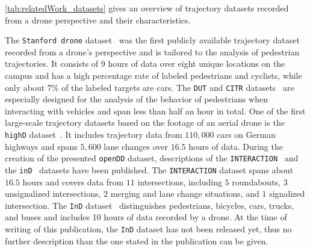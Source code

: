 \documentclass[a4paper, 10pt, conference]{ieeeconf}      %
\begin{document}
\autoref{tab:relatedWork_datasets} gives an overview of trajectory datasets recorded from a drone perspective and their characteristics.

The \texttt{Stanford drone} dataset~\cite{robicquet_learning_2016} was the first publicly available trajectory dataset recorded from a drone's perspective and is tailored to the analysis of pedestrian trajectories.
It consists of $9$ hours of data over eight unique locations on the campus and has a high percentage rate of labeled pedestrians and cyclists, while only about $7\%$ of the labeled targets are cars.
The \texttt{DUT} and \texttt{CITR} datasets~\cite{yang_top-view_2019} are especially designed for the analysis of the behavior of pedestrians when interacting with vehicles and span less than half an hour in total.
One of the first large-scale trajectory datasets based on the footage of an aerial drone is the \texttt{highD} dataset~\cite{krajewski_highd_2018}.
It includes trajectory data from $110,000$ cars on German highways and spans $5,600$ lane changes over $16.5$ hours of data.
During the creation of the presented \texttt{openDD} dataset, descriptions of the \texttt{INTERACTION}~\cite{wei_interaction_2019} and the \texttt{inD}~\cite{bock_ind_2019} datasets have been published.
The \texttt{INTERACTION} dataset spans about $16.5$ hours and covers data from $11$ intersections, including $5$ roundabouts, $3$ unsignalized intersections, $2$ merging and lane change situations, and $1$ signalized intersection.
The \texttt{InD} dataset~\cite{bock_ind_2019} distinguishes pedestrians, bicycles, cars, trucks, and buses and includes 10 hours of data recorded by a drone.
At the time of writing of this publication, the \texttt{InD} dataset has not been released yet, thus no further description than the one stated in the publication can be given.
\end{document}
